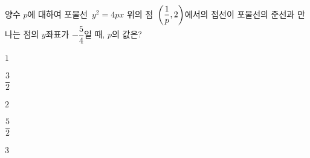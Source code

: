 양수 $p$에 대하여 포물선~$y^2=4px$ 위의 점~$\left(\dfrac{1}{p}{,}\mkern3mu\mathopen{}2\right)$에서의 접선이 포물선의 준선과 만나는 점의 $y$좌표가 $-\dfrac{5}{4}$일 때, $p$의 값은?
\begin{choices32}{\rule[-3ex]{0pt}{8ex}$1$}{\rule[-3ex]{0pt}{8ex}$\dfrac{3}{2}$}{\rule[-3ex]{0pt}{8ex}$2$}{\rule[-3ex]{0pt}{8ex}$\dfrac{5}{2}$}{\rule[-3ex]{0pt}{8ex}$3$}\end{choices32}
